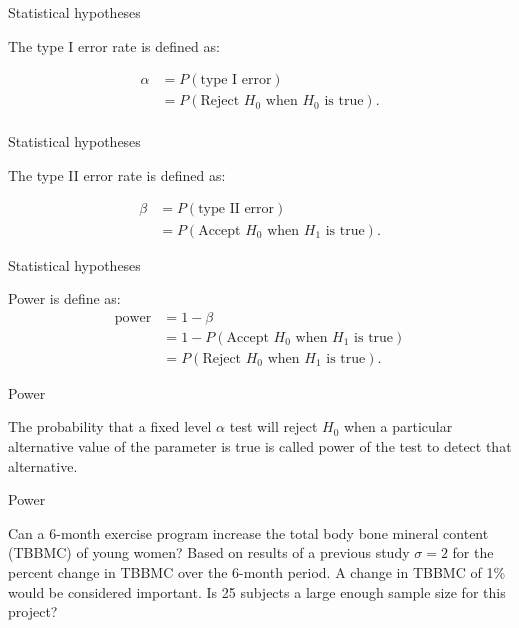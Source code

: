 \documentclass[ignorenonframetext,]{beamer}
\begin{document}
\begin{frame}{Statistical hypotheses}

The type I error rate is defined as:

\[\begin{aligned}
\alpha &=P\left(\text{type I error}\right) \\
       &=P\left(\text{Reject } H_0 \text{ when }H_0 \text{ is true}\right).\\
\end{aligned}\]

\end{frame}

\begin{frame}{Statistical hypotheses}

The type II error rate is defined as:

\[\begin{aligned}
\beta&=P\left(\text{type II error}\right) \\
     &=P\left(\text{Accept }H_0 \text{ when }H_1 \text{ is true}\right).   
\end{aligned}\]

\end{frame}

\begin{frame}{Statistical hypotheses}

Power is define as: \[ \begin{aligned}
\text {power} &= 1-\beta \\
              &= 1-P\left(\text{Accept }H_0 \text{ when }H_1 \text{ is true}\right) \\
              &= P\left(\text{Reject } H_0 \text{ when }H_1 \text{ is true}\right).
\end{aligned}\]

\end{frame}

\begin{frame}{Power}

The probability that a fixed level \(\alpha\) test will reject \(H_0\)
when a particular alternative value of the parameter is true is called
power of the test to detect that alternative.

\end{frame}

\begin{frame}{Power}

Can a 6-month exercise program increase the total body bone mineral
content (TBBMC) of young women? Based on results of a previous study
\(\sigma=2\) for the percent change in TBBMC over the 6-month period. A
change in TBBMC of 1\% would be considered important. Is 25 subjects a
large enough sample size for this project?

\end{frame}
\end{document}
